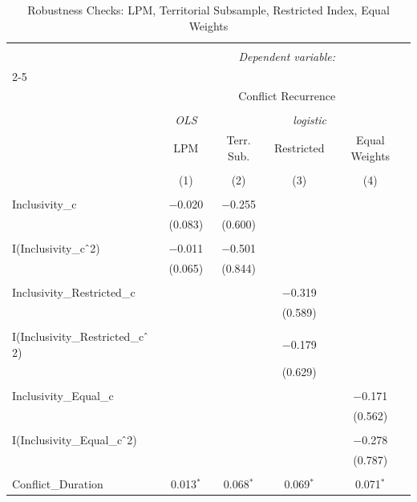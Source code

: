 
\begin{table}[!htbp] \centering 
  \caption{Robustness Checks: LPM, Territorial Subsample, Restricted Index, Equal Weights} 
  \label{tab:results_robust} 
\begin{tabular}{@{\extracolsep{5pt}}lcccc} 
\\[-1.8ex]\hline 
\hline \\[-1.8ex] 
 & \multicolumn{4}{c}{\textit{Dependent variable:}} \\ 
\cline{2-5} 
\\[-1.8ex] & \multicolumn{4}{c}{Conflict Recurrence} \\ 
\\[-1.8ex] & \textit{OLS} & \multicolumn{3}{c}{\textit{logistic}} \\ 
 & LPM & Terr. Sub. & Restricted & Equal Weights \\ 
\\[-1.8ex] & (1) & (2) & (3) & (4)\\ 
\hline \\[-1.8ex] 
 Inclusivity\_c & $-$0.020 & $-$0.255 &  &  \\ 
  & (0.083) & (0.600) &  &  \\ 
  & & & & \\ 
 I(Inclusivity\_c$\hat{\mkern6mu}$2) & $-$0.011 & $-$0.501 &  &  \\ 
  & (0.065) & (0.844) &  &  \\ 
  & & & & \\ 
 Inclusivity\_Restricted\_c &  &  & $-$0.319 &  \\ 
  &  &  & (0.589) &  \\ 
  & & & & \\ 
 I(Inclusivity\_Restricted\_c$\hat{\mkern6mu}$2) &  &  & $-$0.179 &  \\ 
  &  &  & (0.629) &  \\ 
  & & & & \\ 
 Inclusivity\_Equal\_c &  &  &  & $-$0.171 \\ 
  &  &  &  & (0.562) \\ 
  & & & & \\ 
 I(Inclusivity\_Equal\_c$\hat{\mkern6mu}$2) &  &  &  & $-$0.278 \\ 
  &  &  &  & (0.787) \\ 
  & & & & \\ 
 Conflict\_Duration & 0.013$^{*}$ & 0.068$^{*}$ & 0.069$^{*}$ & 0.071$^{*}$ \\ 

\end{tabular}
\end{table}
